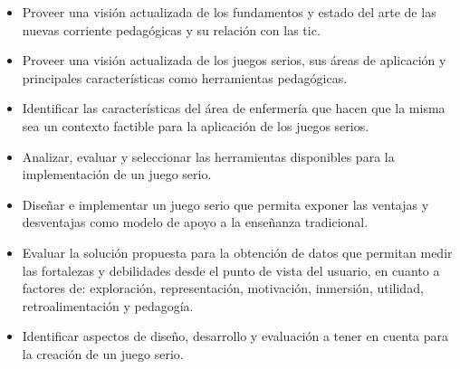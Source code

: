 \begin{itemize}

    \item Proveer una visión actualizada de los fundamentos y estado del arte de
        las nuevas corriente pedagógicas y su relación con las \Gls{tic}.

    \item Proveer una visión actualizada de los juegos serios, sus áreas de
        aplicación y principales características como herramientas pedagógicas.
    
    \item Identificar las características del área de enfermería que hacen que
        la misma sea un contexto factible para la aplicación de los juegos
        serios.
    
    \item Analizar, evaluar y seleccionar las herramientas disponibles para la
        implementación de un juego serio.
        
    \item Diseñar e implementar un juego serio que permita exponer las ventajas
        y desventajas como modelo de apoyo a la enseñanza tradicional. 
        
    \item Evaluar la solución propuesta para la obtención de datos que permitan
        medir las fortalezas y debilidades desde el punto de vista del usuario,
        en cuanto a factores de: exploración, representación, motivación,
        inmersión, utilidad, retroalimentación y pedagogía.
         
     \item Identificar aspectos de diseño, desarrollo y evaluación a tener en
         cuenta para la creación de un juego serio.

\end{itemize}
